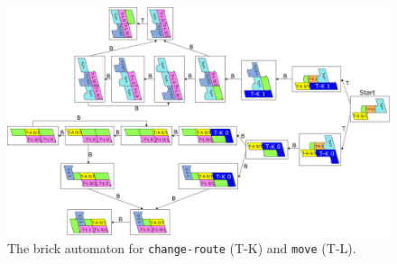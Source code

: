 \documentclass[runningheads]{llncs}
\begin{document}
\begin{figure}[ht]
\centering
\includegraphics[width=\linewidth]{Figs/Turner_BA/move.png}
\caption{The brick automaton for \texttt{change-route} (T-K) and \texttt{move} (T-L).}
\label{fig:BA_move}
\end{figure}
\end{document}
